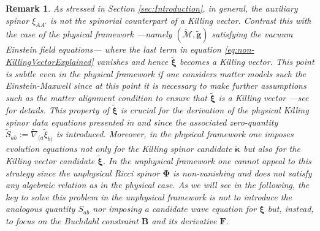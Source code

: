 \documentclass[10pt,a4paper]{article}
\theoremstyle{plain}
\newtheorem{remark}{Remark}
\def\bmg{{\bm g}}
\def\bmB{{\bm B}}
\def\bmF{{\bm F}}
\begin{document}
\begin{remark}
  \emph{ As stressed in Section \ref{sec:Introduction}, in general,
  the auxiliary spinor $\xi_{AA'}$ is not the spinorial counterpart of
  a Killing vector.  Contrast this with the case of the physical
  framework ---namely $(\tilde{\mathcal{M}},\tilde{\bmg})$ satisfying
  the vacuum Einstein field equations--- where the last term in
  equation \eqref{eq:non-KillingVectorExplained} vanishes and hence
  $\tilde{\bm\xi}$ becomes a Killing vector. This point is subtle even
  in the physical framework if one considers matter models such the
  Einstein-Maxwell since at this point it is necessary to make further assumptions
  such as the matter alignment condition to ensure that $\tilde{\bm\xi}$ is a
  Killing vector ---see \cite{ValCol16} for details. This property of
  $\tilde{\bm\xi}$ is crucial for the derivation of the physical
  Killing spinor data equations presented in \cite{GarVal08c} and
  \cite{ValCol16} since the associated zero-quantity $\tilde{S}_{ab}:=
  \tilde{\nabla}_{(a}\tilde{\xi}_{b)}$ is introduced. Moreover, in the
  physical framework one imposes evolution equations not only for the
  Killing spinor candidate $\tilde{\bm\kappa}$ but also for the
  Killing vector candidate $\tilde{\bm\xi}$.  In the unphysical
  framework one cannot appeal to this strategy since the unphysical
  Ricci spinor $\bm\Phi$ is non-vanishing and does not satisfy any
  algebraic relation as in the physical case.
  As we will see in
  the following, the key to solve this problem in the unphysical
  framework is not to introduce the analogous quantity $S_{ab}$ nor
  imposing a candidate wave equation for $\bm\xi$ but, instead, to
  focus on the Buchdahl constraint $\bmB$ and its derivative $\bmF$.
  }
\end{remark}
\end{document}
